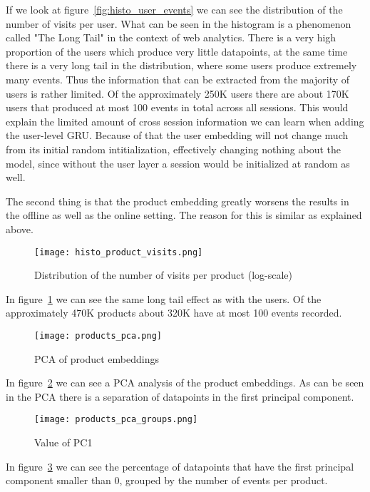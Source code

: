 If we look at figure~\ref{fig:histo_user_events} we can see the distribution of the number of visits per user.
What can be seen in the histogram is a phenomenon called "The Long Tail" in the context of web analytics.
There is a very high proportion of the users which produce very little datapoints, at the same time there is a very long tail in the distribution, where some users produce extremely many events.
Thus the information that can be extracted from the majority of users is rather limited.
Of the approximately 250K users there are about 170K users that produced at most 100 events in total across all sessions.
This would explain the limited amount of cross session information we can learn when adding the user-level GRU.
Because of that the user embedding will not change much from its initial random intitialization, effectively changing nothing about the model, since without the user layer a session would be initialized at random as well.
\par
The second thing is that the product embedding greatly worsens the results in the offline as well as the online setting.
The reason for this is similar as explained above.
\begin{figure}[t]
	\centering
	\captionsetup{width=0.8\textwidth}
    \texttt{[image: histo\_product\_visits.png]}
    \caption{Distribution of the number of visits per product (log-scale)}
    \label{fig:histo_product_events}
\end{figure}
In figure~\ref{fig:histo_product_events} we can see the same long tail effect as with the users.
Of the approximately 470K products about 320K have at most 100 events recorded.
\begin{figure}[t]
	\centering
	\captionsetup{width=0.8\textwidth}
    \texttt{[image: products\_pca.png]}
    \caption{PCA of product embeddings}
    \label{fig:products_pca}
\end{figure}
In figure~\ref{fig:products_pca} we can see a PCA analysis of the product embeddings.
As can be seen in the PCA there is a separation of datapoints in the first principal component.
\begin{figure}[t]
	\centering
	\captionsetup{width=0.8\textwidth}
    \texttt{[image: products\_pca\_groups.png]}
    \caption{Value of PC1}
    \label{fig:products_pca_groups}
\end{figure}
In figure~\ref{fig:products_pca_groups} we can see the percentage of datapoints that have the first principal component smaller than 0, grouped by the number of events per product.
